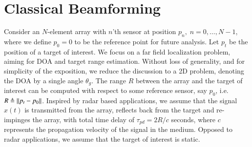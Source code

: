 \section{Classical Beamforming }\label{sec:setup}
Consider an $N$-element array with $n$'th sensor at position $p_n,\; n=0,\ldots,N-1$, where we define $p_{0}=0$ to be the reference point for future analysis. Let $p_t$ be the position of a target of interest. We focus on a far field localization problem, aiming for DOA and target range estimation. Without loss of generality, and for simplicity of the exposition, we reduce the discussion to a 2D problem, denoting the DOA by a single angle $\theta_g$. The range $R$ between the array and the target of interest can be computed with respect to some reference sensor, say $p_{0}$, i.e. $R\triangleq\left\Vert p_{t}-p_{0}\right\Vert$. 
Inspired by radar based applications, we assume that the signal $x(t)$ is transmitted from the array, reflects back from the target and re-impinges the array, with total time delay of $\tau_{pd}=2R/c$ seconds, where $c$ represents the propagation velocity of the signal in the medium. Opposed to radar applications, we assume that the target of interest is static. 

